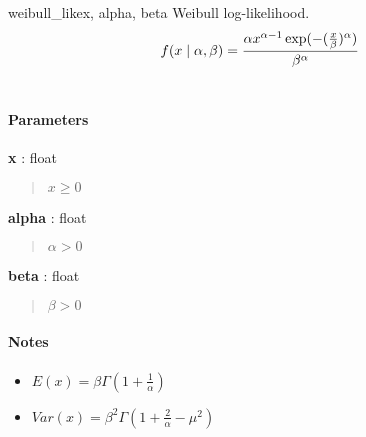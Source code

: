 \hypertarget{pymc.distributions.weibull_like}{}
\begin{funcdesc}{weibull\_like}{x, alpha, beta}
Weibull log-likelihood.
\begin{gather}
\begin{split}f(x \mid \alpha, \beta) = \frac{\alpha x^{\alpha - 1}
\exp(-(\frac{x}{\beta})^{\alpha})}{\beta^\alpha}\end{split}\notag\\\begin{split}\end{split}\notag
\end{gather}\paragraph{Parameters}\begin{paramlist}

\item[] \textbf{x} : float
\begin{quote}

$x \ge 0$
\end{quote}

\item[] \textbf{alpha} : float
\begin{quote}

$\alpha>0$
\end{quote}

\item[] \textbf{beta} : float
\begin{quote}

$\beta>0$
\end{quote}
\end{paramlist}
\paragraph{Notes}
\begin{itemize}
\item {} 
$E(x)=\beta \Gamma(1+\frac{1}{\alpha})$

\item {} 
$Var(x)=\beta^2 \Gamma(1+\frac{2}{\alpha} - \mu^2)$

\end{itemize}
\end{funcdesc}

